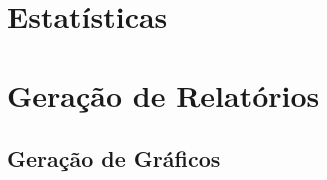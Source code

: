 \section{\label{model:statistics}Estatísticas}
\lipsum[4]

\section{\label{model:report}Geração de Relatórios}
\lipsum[5]

\subsection{\label{model:report:charts}Geração de Gráficos}
\lipsum[5]




